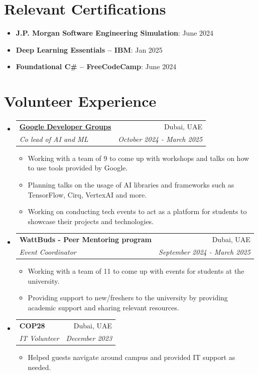 \documentclass[a4paper,20pt]{article}
\makeatletter
\newcommand{\resumeItem}[2] {
	\item\small{
		\textbf{#1}{: #2 \vspace{-2pt}}
	}
}
\newcommand{\resumeItemWithoutTitle}[1] {
	\item\small{
		{#1 \vspace{-2pt}}
	}
}
\newcommand{\resumeSubheading}[4] {
	\vspace{-1pt}\item
	\begin{tabular*}{0.97\textwidth}{l@{\extracolsep{\fill}}r}
		\textbf{#1} & #2 \\
		\textit{#3} & \textit{#4} \\
	\end{tabular*}\vspace{-5pt}
}
\newcommand{\resumeSubItem}[2]{\resumeItem{#1}{#2}\vspace{-3pt}}
\newcommand{\resumeSubHeadingListStart}{\begin{itemize}[leftmargin=*]}
\newcommand{\resumeSubHeadingListEnd}{\end{itemize}}
\newcommand{\resumeItemListStart}{\begin{itemize}}
\newcommand{\resumeItemListEnd}{\end{itemize}\vspace{-5pt}}
\makeatother
\begin{document}
\section{Relevant Certifications}
\resumeSubHeadingListStart
    \resumeSubItem{J.P. Morgan Software Engineering Simulation}{June 2024}
    \resumeSubItem{Deep Learning Essentials – IBM}{Jan 2025}
    \resumeSubItem{Foundational C\# – FreeCodeCamp}{June 2024}
\resumeSubHeadingListEnd

\vspace{2pt}

\section{Volunteer Experience}
	\resumeSubHeadingListStart
		\resumeSubheading{\href{https://gdg.community.dev/gdg-on-campus-heriot-watt-university-dubai-dubai-united-arab-emirates}{Google Developer Groups}}{Dubai, UAE}{Co lead of AI and ML}{October 2024 - March 2025}
		\resumeItemListStart
			\resumeItemWithoutTitle{Working with a team of 9 to come up with workshops and talks on how to use tools provided by Google.}
			\resumeItemWithoutTitle{Planning talks on the usage of AI libraries and frameworks such as TensorFlow, Cirq, VertexAI and more.}
			\resumeItemWithoutTitle{Working on conducting tech events to act as a platform for students to showcase their projects and technologies.}
		\resumeItemListEnd
	\resumeSubHeadingListEnd

    \resumeSubHeadingListStart
		\resumeSubheading{{WattBuds - Peer Mentoring program}}{Dubai, UAE}{Event Coordinator}{September 2024 - March 2025}
		\resumeItemListStart
			\resumeItemWithoutTitle{Working with a team of 11 to come up with events for students at the university.}
			\resumeItemWithoutTitle{Providing support to new/freshers to the university by providing academic support and sharing relevant resources.}
		\resumeItemListEnd
	\resumeSubHeadingListEnd

    \resumeSubHeadingListStart
		\resumeSubheading{{COP28}}{Dubai, UAE}{IT Volunteer}{December 2023}
		\resumeItemListStart
			\resumeItemWithoutTitle{Helped guests navigate around campus and provided IT support as needed.}
		\resumeItemListEnd
	\resumeSubHeadingListEnd
\end{document}
